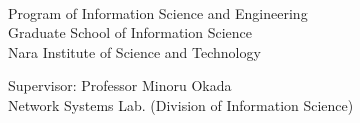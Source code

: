 \renewcommand\thepage{Title1}
\thispagestyle{empty}
 \vspace*{9truemm}
 \begin{center}
  \Large\bfseries\edoctitle
 \end{center}
 \vspace*{27truemm}
 \begin{center}
  \Large\bfseries\etitle
 \end{center}
 \vspace*{45truemm}
 \begin{center}
  \eauthor \\
  Program of Information Science and Engineering \\
  Graduate School of Information Science \\
  Nara Institute of Science and Technology
 \end{center}
 \vspace*{10truemm}
 \begin{center}
    Supervisor: Professor Minoru Okada \\
    Network Systems Lab. (Division of Information Science)
   \end{center}
 \vspace*{10truemm}
 \begin{center}
  \edate
 \end{center}
 \vspace*{1truemm}
 \vspace*{\fill}